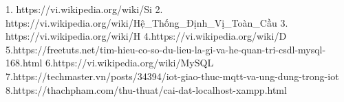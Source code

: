 1. https://vi.wikipedia.org/wiki/Si%
2. https://vi.wikipedia.org/wiki/Hệ_Thống_Định_Vị_Toàn_Cầu
3. https://vi.wikipedia.org/wiki/H%
4.https://vi.wikipedia.org/wiki/D%
5.https://freetuts.net/tim-hieu-co-so-du-lieu-la-gi-va-he-quan-tri-csdl-mysql-168.html
6.https://vi.wikipedia.org/wiki/MySQL
7.https://techmaster.vn/posts/34394/iot-giao-thuc-mqtt-va-ung-dung-trong-iot
8.https://thachpham.com/thu-thuat/cai-dat-localhost-xampp.html
